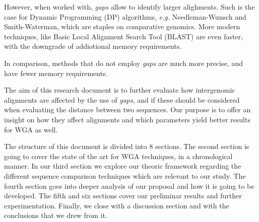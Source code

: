 \medskip

However, when worked with, \textit{gaps} allow to identify larger alighments. Such is the case for Dynamic Programming (DP) algorithms, \textit{e.g.} Needleman-Wunsch and Smith-Waterman, which are staples on comparative genomics. More modern techniques, like Basic Local Alignment Search Tool (BLAST) are even faster, with the downgrade of addiotional memory requirements. 

\medskip

In comparison, methods that do not employ \textit{gaps} are much more precise, and have fewer memory requirements.

\medskip

The aim of this research document is to further evaluate how intergenomic alignments are affected by the use of \textit{gaps}, and if these should be considered when evaluating the distance between two sequences. Our purpose is to offer an insight on how they affect alignments and which parameters yield better results for WGA as well.

\medskip

The structure of this document is divided into 8 sections. The second section is going to cover the state of the art for WGA techniques, in a chronological manner. In our third section we explore our theoric framework regarding the different sequence comparison techniques which are relevant to our study. The fourth section goes into deeper analysis of our proposal and how it is going to be developed. The fifth and six sections cover our preliminar results and further experimentation. Finally, we close with a discussion section and with the conclusions that we drew from it.